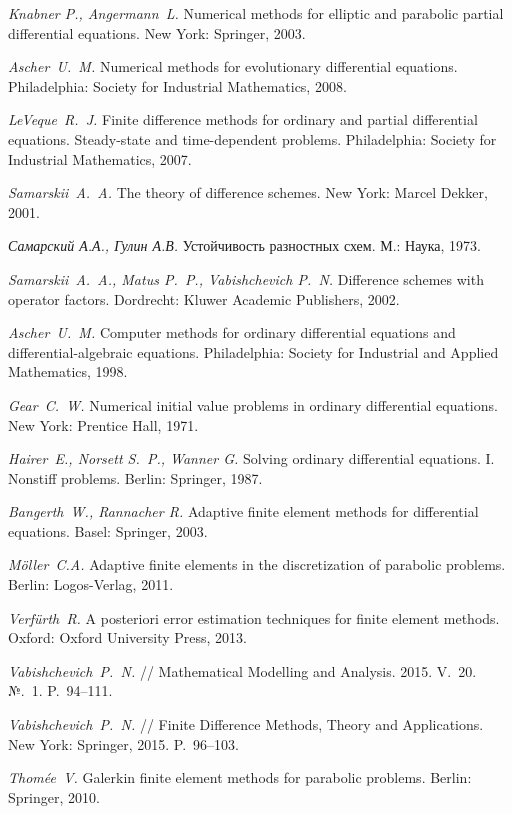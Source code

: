 \documentclass[12pt]{ncc}
\numberwithin{equation}{section}
\begin{document}
\clearpage


\begin{thebibliography}{10}

\textit{Knabner P., Angermann~L.} Numerical methods for elliptic and parabolic partial
  differential equations. New York: Springer, 2003.

\textit{Ascher~U.~M.} Numerical methods for evolutionary differential
  equations. Philadelphia: Society for Industrial Mathematics, 2008.

\textit{LeVeque~R.~J.} Finite difference methods for ordinary and partial
  differential equations. Steady-state and time-dependent problems. Philadelphia: 
Society for Industrial Mathematics, 2007.

\textit{Samarskii~A.~A.} The theory of difference schemes. New York: Marcel Dekker, 2001.

\textit{Самарский А.А., Гулин А.В.} Устойчивость разностных схем. М.: Наука, 1973.

\textit{Samarskii~A.~A., Matus P.~P., Vabishchevich P.~N.} Difference schemes with operator factors.
Dordrecht: Kluwer Academic Publishers, 2002.

\textit{Ascher~U.~M.} Computer methods for ordinary differential equations
  and differential-algebraic equations. Philadelphia: Society for Industrial and Applied Mathematics, 1998.

\textit{Gear~C.~W.} {Numerical initial value problems in ordinary
  differential equations}. New York: Prentice Hall, 1971.

\textit{Hairer~E., Norsett S.~P., Wanner G.} Solving ordinary differential equations. I. Nonstiff
  problems. Berlin: Springer, 1987.

\textit{Bangerth~W., Rannacher R.} Adaptive finite element methods for differential
  equations. Basel: Springer, 2003.

\textit{M{\"o}ller~C.A.} Adaptive finite elements in the discretization of
  parabolic problems. Berlin: Logos-Verlag, 2011.

\textit{Verf{\"u}rth~R.} A posteriori error estimation techniques for finite
  element methods. Oxford: Oxford University Press, 2013.

\textit{Vabishchevich~P.~N.} //  Mathematical Modelling and Analysis. 2015. V.~20. №.~1. P.~94--111.

\textit{Vabishchevich~P.~N.} // Finite Difference Methods, Theory and
  Applications. New York: Springer, 2015. P.~96--103.

\textit{Thom{\'e}e~V.} Galerkin finite element methods for parabolic
  problems. Berlin: Springer, 2010.

\end{thebibliography}
 
\end{document}
